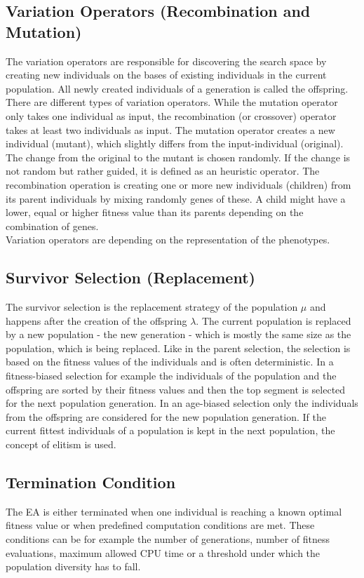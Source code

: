         \subsection{Variation Operators (Recombination and Mutation)}
        The variation operators are responsible for discovering the search space by creating new individuals on the bases of existing individuals in the current population. All newly created individuals of a generation is called the offspring.\\
        There are different types of variation operators. While the mutation operator only takes one individual as input, the recombination (or crossover) operator takes at least two individuals as input. The mutation operator creates a new individual (mutant), which slightly differs from the input-individual (original). The change from the original to the mutant is chosen randomly. If the change is not random but rather guided, it is defined as an heuristic operator. The recombination operation is creating one or more new individuals (children) from its parent individuals by mixing randomly genes of these. A child might have a lower, equal or higher fitness value than its parents depending on the combination of genes.\\
        Variation operators are depending on the representation of the phenotypes.
        
        \subsection{Survivor Selection (Replacement)}
        The survivor selection is the replacement strategy of the population $\mu$ and happens after the creation of the offspring $\lambda$. The current population is replaced by a new population - the new generation - which is mostly the same size as the population, which is being replaced. Like in the parent selection, the selection is based on the fitness values of the individuals and is often deterministic. In a fitness-biased selection for example the individuals of the population and the offspring are sorted by their fitness values and then the top segment is selected for the next population generation. In an age-biased selection only the individuals from the offspring are considered for the new population generation. If the current fittest individuals of a population is kept in the next population, the concept of elitism is used.
        
        \subsection{Termination Condition}
        The EA is either terminated when one individual is reaching a known optimal fitness value or when predefined computation conditions are met. These conditions can be for example the number of generations, number of fitness evaluations, maximum allowed CPU time or a threshold under which the population diversity has to fall.
        
